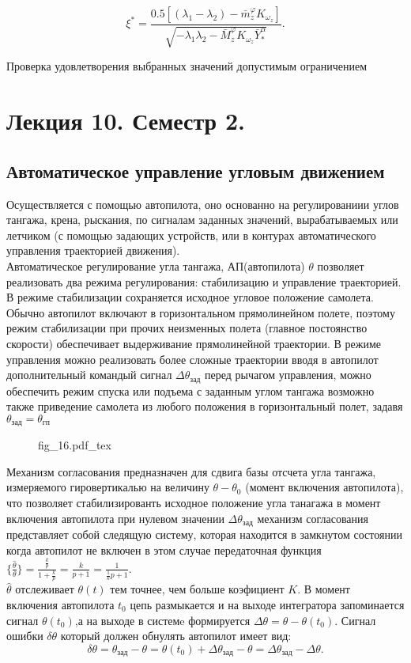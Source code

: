 \documentclass{article}
\begin{document}
\[
	\xi^* = \frac{0.5[(\lambda_1 - \lambda_2) - \bar{m}_z^\varphi K_{\omega_z}]}{\sqrt{-\lambda_1\lambda_2 - \bar{M}_z^\varphi K_{\omega_z}\bar{Y}_*^\alpha }}.
\]

Проверка удовлетворения выбранных значений допустимым ограничением

\section{Лекция 10. Семестр 2.}
\subsection{Автоматическое управление угловым движением}
Осуществляется с помощью автопилота, оно основанно на регулированиии углов тангажа, крена, рыскания, по сигналам заданных значений, вырабатываемых или летчиком (с помощью задающих устройств, или в контурах автоматического управления траекторией движения).\\ 
Автоматическое регулирование угла тангажа, АП(автопилота) $\theta$ позволяет реализовать два режима регулирования: стабилизацию и управление траекторией.\\ 
В режиме стабилизации сохраняется исходное угловое положение самолета. Обычно автопилот включают в горизонтальном прямолинейном полете, поэтому режим стабилизации при прочих неизменных полета (главное постоянство скорости) обеспечивает выдерживание прямолинейной траектории. В режиме управления можно реализовать более сложные траектории вводя в автопилот дополнительный командый сигнал $\Delta \theta_\text{зад}$ перед рычагом управления, можно обеспечить режим спуска или подъема с заданным углом тангажа возможно также приведение самолета из любого положения в горизонтальный полет, задавя $\theta_\text{зад} = \theta_\text{гп}$

\begin{figure}[ht]
	\centering
	{fig_16.pdf_tex}
\end{figure}

Механизм согласования предназначен для сдвига базы отсчета угла тангажа, измеряемого гировертикалью на величину $\theta - \theta_0$ (момент включения автопилота), что позволяет стабилизированть исходное положение угла танагажа в момент включения автопилота при нулевом значении $\Delta \theta_\text{зад}$ механизм согласования представляет собой следящую систему, которая находится в замкнутом состоянии когда автопилот не включен в этом случае передаточная функция $\{{\frac{\hat{\theta}}{\theta}}\}= \frac{\frac{k}{p}}{1 + \frac{k}{p}} =\frac{k}{p+1}=\frac{1}{\frac{1}{k}p + 1}$.\\
$\hat{\theta}$ отслеживает $\theta(t)$ тем точнее, чем больше коэфициент $K$. В момент включения автопилота $t_0$ цепь размыкается и на выходе интегратора запоминается сигнал $\theta(t_0)$,а на выходе в системe формируется $\Delta \theta = \theta - \theta(t_0)$. Сигнал ошибки $\delta \theta $ который должен обнулять автопилот имеет вид:
\[
	\delta \theta = \theta_\text{зад} - \theta = \theta(t_0) + \Delta \theta_\text{зад} - \theta = \Delta \theta_\text{зад} - \Delta \theta.
\]
\end{document}
